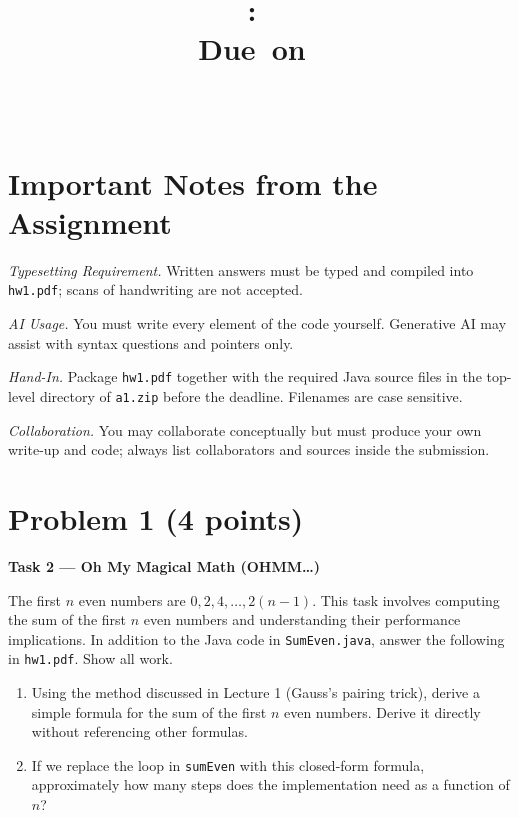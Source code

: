\documentclass{article}
\title{
      \vspace{2in}
      \textmd{\textbf{\hmwkClass:\ \hmwkTitle}}\\
      \normalsize\vspace{0.1in}\small{Due\ on\ \hmwkDueDate}\\
      \vspace{0.1in}\large{\textit{\hmwkClassInstructor\ \hmwkClassTime}}
      \vspace{3in}
  }
\author{\hmwkAuthorName}
\date{}
\theoremstyle{remark}
\begin{document}
  \maketitle
  \newpage

  \section*{Important Notes from the Assignment}

  \textit{Typesetting Requirement.} Written answers must be typed and compiled into
  \texttt{hw1.pdf}; scans of handwriting are not accepted.

  \textit{AI Usage.} You must write every element of the code yourself. Generative AI may assist
  with syntax questions and pointers only.

  \textit{Hand-In.} Package \texttt{hw1.pdf} together with the required Java source files in the
  top-level directory of \texttt{a1.zip} before the deadline. Filenames are case sensitive.

  \textit{Collaboration.} You may collaborate conceptually but must produce your own write-up and
  code; always list collaborators and sources inside the submission.

  \newpage

  \section*{Problem 1 (4 points)}

  \textbf{Task 2 --- Oh My Magical Math (OHMM\ldots{})}

  The first $n$ even numbers are $0, 2, 4, \ldots, 2(n-1)$. This task involves computing the sum
  of the first
  $n$ even numbers and understanding their performance implications. In addition to the Java
  code in
  \texttt{SumEven.java}, answer the following in \texttt{hw1.pdf}. Show all work.

  \begin{enumerate}
      \item[(a)] Using the method discussed in Lecture 1 (Gauss's pairing trick), derive a simple
  formula for the sum of the first $n$ even numbers. Derive it directly without referencing other
  formulas.
      \item[(b)] If we replace the loop in \texttt{sumEven} with this closed-form formula,
  approximately how many steps does the implementation need as a function of $n$?
  \end{enumerate}
\end{document}
